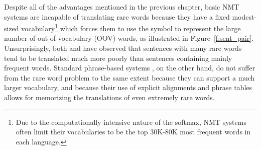 Despite all of the advantages mentioned in the previous chapter, basic NMT systems are incapable of translating rare 
words because they have a fixed modest-sized vocabulary\footnote{ Due to the computationally intensive nature of the softmax, NMT systems often limit 
their vocabularies to be the top 30K-80K most frequent words in each language. 
}
which forces them to use the \unksym{} symbol to 
represent the large number of out-of-vocabulary (OOV) words, as illustrated in Figure~\ref{f:sent_pair}.
Unsurprisingly, both  and  have
observed that sentences with many rare words tend to be translated much more poorly than sentences
containing mainly frequent words.
Standard phrase-based systems \cite{koehn2007moses,chiang07hiero,cer10phrasal,dyer10cdec}, 
on the other hand, do not suffer from the rare word 
problem to the same extent because they can support a much larger vocabulary, 
and because their use of explicit alignments
and phrase tables allows for memorizing the translations 
of even extremely rare words. 

\begin{figure*}
\caption[Example of the rare word problem]{{\bf Example of the rare word problem} -- An English source sentence ({\it en}), a human translation to French ({\it fr}), and a translation produced by one of my neural network systems ({\it nn}) before handling OOV words. I highlight  that are unknown to my model. 
The token \unksym{} indicates an OOV word. 
I also show a few important alignments between the pair of sentences. 
}
\label{f:sent_pair}
\end{figure*}

